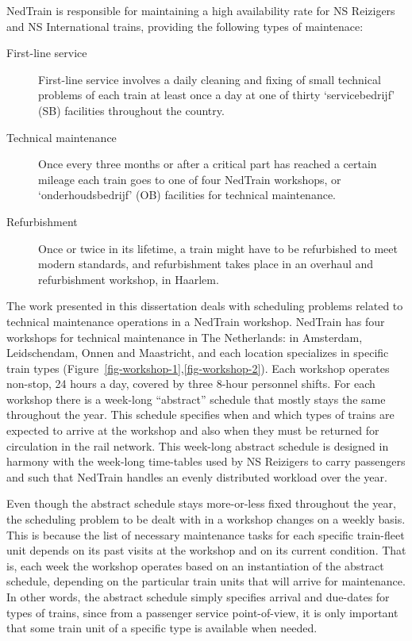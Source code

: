 		NedTrain is responsible for maintaining a high availability rate for NS Reizigers and NS International trains, 
		providing the following types of maintenace: 
		\begin{description}
			\item[First-line service] 
			First-line service involves a daily cleaning and fixing of small technical problems 
			of each train at least once a day at one of thirty `servicebedrijf' (SB) facilities throughout the country. 

			\item[Technical maintenance]
			Once every three months or after a critical part has reached a certain mileage 
			each train goes to one of four NedTrain workshops, or `onderhoudsbedrijf' (OB) facilities for technical maintenance. 

			\item[Refurbishment] 
			Once or twice in its lifetime, a train might have to be refurbished to meet modern standards, 
			and refurbishment takes place in an overhaul and refurbishment workshop, in Haarlem.
		\end{description}
		The work presented in this dissertation deals with scheduling problems 
		related to technical maintenance operations in a NedTrain workshop.
		NedTrain has four workshops for technical maintenance in The Netherlands: 
		in Amsterdam, Leidschendam, Onnen and Maastricht, and each location specializes in specific train types 
		(Figure~\ref{fig-workshop-1},\ref{fig-workshop-2}).
		Each workshop operates non-stop, 24 hours a day, covered by three 8-hour personnel shifts.
		For each workshop there is a week-long ``abstract'' schedule that mostly stays the same throughout the year.
		This schedule specifies when and which types of trains are expected to arrive at the workshop 
		and also when they must be returned for circulation in the rail network.
		This week-long abstract schedule is designed in harmony with the week-long time-tables used by NS Reizigers to carry passengers
		and such that NedTrain handles an evenly distributed workload over the year.

		Even though the abstract schedule stays more-or-less fixed throughout the year,
		the scheduling problem to be dealt with in a workshop changes on a weekly basis.
		This is because the list of necessary maintenance tasks for each specific train-fleet unit depends 
		on its past visits at the workshop and on its current condition.
		That is, each week the workshop operates based on an instantiation of the abstract schedule, 
		depending on the particular train units that will arrive for maintenance.
		In other words, the abstract schedule simply specifies arrival and due-dates for types of trains, 
		since from a passenger service point-of-view,
		it is only important that some train unit of a specific type is available when needed.

